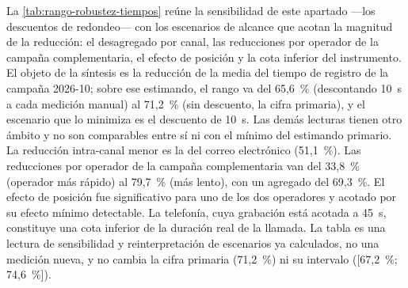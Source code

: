 La \autoref{tab:rango-robustez-tiempos} reúne la sensibilidad de este apartado ---los descuentos de redondeo--- con los escenarios de alcance que acotan la magnitud de la reducción: el desagregado por canal, las reducciones por operador de la campaña complementaria, el efecto de posición y la cota inferior del instrumento. El objeto de la síntesis es la reducción de la media del tiempo de registro de la campaña 2026-10; sobre ese estimando, el rango va del 65,6~\% (descontando 10~s a cada medición manual) al 71,2~\% (sin descuento, la cifra primaria), y el escenario que lo minimiza es el descuento de 10~s. Las demás lecturas tienen otro ámbito y no son comparables entre sí ni con el mínimo del estimando primario. La reducción intra-canal menor es la del correo electrónico (51,1~\%). Las reducciones por operador de la campaña complementaria van del 33,8~\% (operador más rápido) al 79,7~\% (más lento), con un agregado del 69,3~\%. El efecto de posición fue significativo para uno de los dos operadores y acotado por su efecto mínimo detectable. La telefonía, cuya grabación está acotada a 45~s, constituye una cota inferior de la duración real de la llamada. La tabla es una lectura de sensibilidad y reinterpretación de escenarios ya calculados, no una medición nueva, y no cambia la cifra primaria (71,2~\%) ni su intervalo ([67,2~\%; 74,6~\%]).

